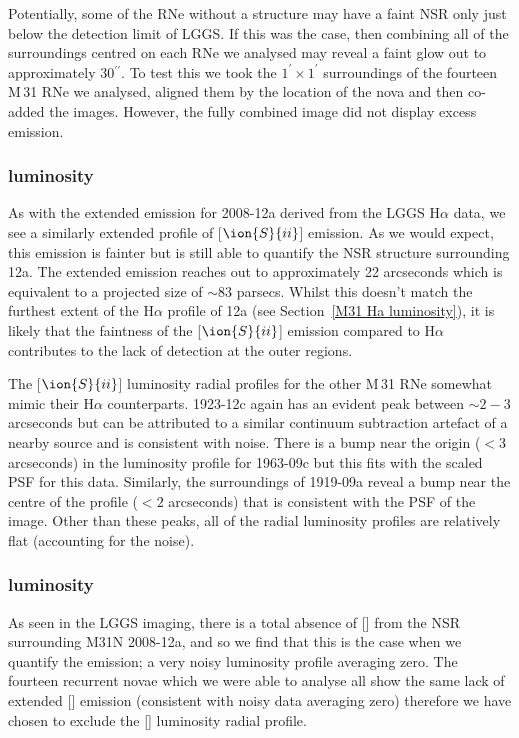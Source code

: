 \documentclass[fleqn,usenatbib]{mnras}
\begin{document}
Potentially, some of the RNe without a structure may have a faint NSR only just below the detection limit of LGGS. If this was the case, then combining all of the surroundings centred on each RNe we analysed may reveal a faint glow out to approximately 30$^{\prime \prime}$. To test this we took the $1^{\prime} \times 1^{\prime}$ surroundings of the fourteen M\,31 RNe we analysed, aligned them by the location of the nova and then co-added the images. However, the fully combined image did not display excess emission.

\subsubsection{\texorpdfstring{\boldmath{$[\ion{S}{ii}]$}}{$[\ion{S}{ii}]$} luminosity}\label{M31 [SII] luminosity}
As with the extended emission for 2008-12a derived from the LGGS H$\alpha$ data, we see a similarly extended profile of [$\ion{S}{ii}$] emission. As we would expect, this emission is fainter but is still able to quantify the NSR structure surrounding 12a. The extended emission reaches out to approximately 22 arcseconds which is equivalent to a projected size of ${\sim}$83 parsecs. Whilst this doesn't match the furthest extent of the H$\alpha$ profile of 12a (see Section~\ref{M31 Ha luminosity}), it is likely that the faintness of the [$\ion{S}{ii}$] emission compared to H$\alpha$ contributes to the lack of detection at the outer regions.

The [$\ion{S}{ii}$] luminosity radial profiles for the other M\,31 RNe somewhat mimic their H$\alpha$ counterparts. 1923-12c again has an evident peak between ${\sim}2 - 3$ arcseconds but can be attributed to a similar continuum subtraction artefact of a nearby source and is consistent with noise. There is a bump near the origin ($< 3$ arcseconds) in the luminosity profile for 1963-09c but this fits with the scaled PSF for this data. Similarly, the surroundings of 1919-09a reveal a bump near the centre of the profile ($< 2$ arcseconds) that is consistent with the PSF of the image. Other than these peaks, all of the radial luminosity profiles are relatively flat (accounting for the noise).

\subsubsection{\texorpdfstring{}{$[\ion{O}{iii}]$} luminosity}\label{M31 [OIII] luminosity}
As seen in the LGGS imaging, there is a total absence of [] from the NSR surrounding M31N 2008-12a, and so we find that this is the case when we quantify the emission; a very noisy luminosity profile averaging zero. The fourteen recurrent novae which we were able to analyse all show the same lack of extended [] emission (consistent with noisy data averaging zero) therefore we have chosen to exclude the [] luminosity radial profile.
\end{document}
